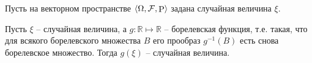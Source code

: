 Пусть на векторном пространстве $\langle \Omega, \mathcal F, \P\rangle$ задана случайная величина $\xi$. 

\begin{to_thr}[]
    Пусть $\xi$ -- случайная величина, а $g \colon \mathbb{R} \mapsto \mathbb{R}$ -- борелевская функция, т.е. такая, что для всякого борелевского множества $B$ его прообраз $g^{-1} (B)$ есть снова борелевское множество. Тогда $g(\xi)$ -- случайная величина.
\end{to_thr}